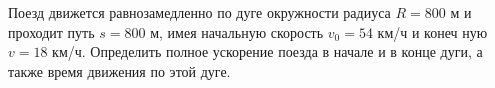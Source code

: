 Поезд движется равнозамедленно по дуге окружности радиуса $R=800$ м и
проходит путь $s=800$ м, имея начальную скорость $v_0=54$ км/ч и конеч
ную $v=18$ км/ч. Определить полное ускорение поезда в начале и в конце
дуги, а также время движения по этой дуге.
